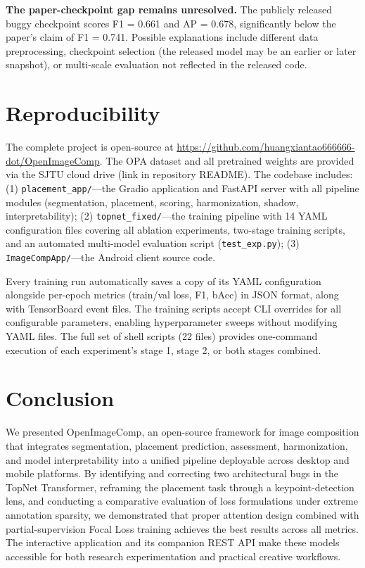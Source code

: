 \documentclass[10pt,twocolumn]{article}
\begin{document}
\textbf{The paper-checkpoint gap remains unresolved.} The publicly released buggy checkpoint scores F1 = 0.661 and AP = 0.678, significantly below the paper's claim of F1 = 0.741. Possible explanations include different data preprocessing, checkpoint selection (the released model may be an earlier or later snapshot), or multi-scale evaluation not reflected in the released code.


\section{Reproducibility}

The complete project is open-source at \url{https://github.com/huangxiantao666666-dot/OpenImageComp}. The OPA dataset and all pretrained weights are provided via the SJTU cloud drive (link in repository README). The codebase includes: (1) \texttt{placement\_app/}---the Gradio application and FastAPI server with all pipeline modules (segmentation, placement, scoring, harmonization, shadow, interpretability); (2) \texttt{topnet\_fixed/}---the training pipeline with 14 YAML configuration files covering all ablation experiments, two-stage training scripts, and an automated multi-model evaluation script (\texttt{test\_exp.py}); (3) \texttt{ImageCompApp/}---the Android client source code.

Every training run automatically saves a copy of its YAML configuration alongside per-epoch metrics (train/val loss, F1, bAcc) in JSON format, along with TensorBoard event files. The training scripts accept CLI overrides for all configurable parameters, enabling hyperparameter sweeps without modifying YAML files. The full set of shell scripts (22 files) provides one-command execution of each experiment's stage 1, stage 2, or both stages combined.


\section{Conclusion}

We presented OpenImageComp, an open-source framework for image composition that integrates segmentation, placement prediction, assessment, harmonization, and model interpretability into a unified pipeline deployable across desktop and mobile platforms. By identifying and correcting two architectural bugs in the TopNet Transformer, reframing the placement task through a keypoint-detection lens, and conducting a comparative evaluation of loss formulations under extreme annotation sparsity, we demonstrated that proper attention design combined with partial-supervision Focal Loss training achieves the best results across all metrics. The interactive application and its companion REST API make these models accessible for both research experimentation and practical creative workflows.
\end{document}
